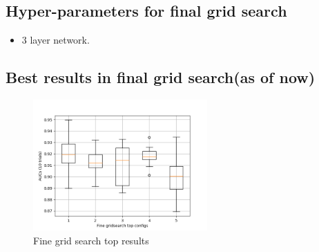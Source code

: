 \subsection{Hyper-parameters for final grid search}
\begin{itemize}
 \item 3 layer network.
\end{itemize}

\subsection{Best results in final grid search(as of now)}



\begin{figure}[h]
\centering
\includegraphics[height= 5cm]{images/densenet/fine_grid_search_top_configs}
\caption{Fine grid search top results}
\label{fig:fine_grid_search_top_configs}
\end{figure}

